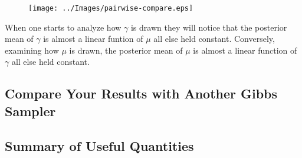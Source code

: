 \documentclass{article}
\begin{document}
\begin{figure}
\texttt{[image: ../Images/pairwise-compare.eps]}
\label{fig:pairwise-compare}
\end{figure}

When one starts to analyze how $\gamma$ is drawn they will notice that the posterior mean of $\gamma$ is almost a linear funtion of $\mu$ all else held constant.  Conversely, examining how $\mu$ is drawn, the posterior mean of $\mu$ is almost a linear function of $\gamma$ all else held constant.

\subsection{Compare Your Results with Another Gibbs Sampler}

\subsection{Summary of Useful Quantities}
\end{document}
